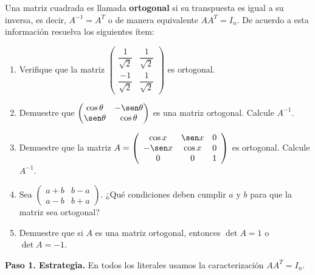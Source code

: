 \begin{prob}
Una matriz cuadrada es llamada \textbf{ortogonal} si su transpuesta es igual a su inversa, es decir, $A^{-1}=A^{T}$ o de manera equivalente $AA^{T}=I_{n}.$ De acuerdo a esta información resuelva los siguientes ítem:  

\begin{enumerate}[$(a)$]
\item Verifique que la matriz $\begin{pmatrix} \dfrac{1}{\sqrt{2}}&\dfrac{1}{\sqrt{2}}\\\dfrac{-1}{\sqrt{2}}&\dfrac{1}{\sqrt{2}}\end{pmatrix}$ es ortogonal.

\item Demuestre que $\begin{pmatrix} \cos\theta & -\sen\theta\\\sen\theta&\cos\theta \end{pmatrix}$ es una matriz ortogonal. Calcule $A^{-1}.$

\item Demuestre que la matriz $A=\left(
\begin{array}{ccc}
\cos x & \sen x & 0 \\
-\sen x & \cos x & 0 \\
0 & 0 & 1
\end{array}
\right)$ es ortogonal. Calcule $A^{-1}$.

\item Sea $\begin{pmatrix}
a+b & b-a \\
a-b & b+a
\end{pmatrix}.$ ¿Qué condiciones deben cumplir $a$ y $b$ para que la matriz sea ortogonal?

\item Demuestre que si $A$ es una matriz ortogonal, entonces $\det A=1$ o $\det A=-1.$
\end{enumerate}

\begin{myproof}
\textbf{Paso 1. Estrategia.} En todos los literales usamos la caracterización $AA^{T}=I_n$.


\end{myproof}
\end{prob}
